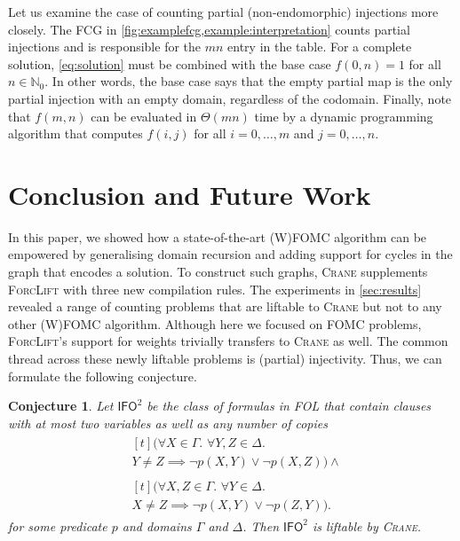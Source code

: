 \documentclass[letterpaper]{article} %
\newcommand{\IFO}{$\mathsf{I}\mathsf{FO}^{2}$}
\newtheorem{conjecture}{Conjecture}
\theoremstyle{definition}
\begin{document}
Let us examine the case of counting partial (non-endomorphic) injections more
closely. The FCG in \cref{fig:examplefcg,example:interpretation} counts partial
injections and is responsible for the $mn$ entry in the table. For a complete
solution, \cref{eq:solution} must be combined with the base case $f(0, n) = 1$
for all $n \in \mathbb{N}_{0}$. In other words, the base case says that the
empty partial map is the only partial injection with an empty domain, regardless
of the codomain. Finally, note that $f(m, n)$ can be evaluated in $\Theta(mn)$
time by a dynamic programming algorithm that computes $f(i, j)$ for all
$i = 0, \dots, m$ and $j = 0, \dots, n$.

\section{Conclusion and Future Work}\label{sec:conclusion}


In this paper, we showed how a state-of-the-art (W)FOMC algorithm can be
empowered by generalising domain recursion and adding support for cycles in the
graph that encodes a solution. To construct such graphs, \textsc{Crane}
supplements \textsc{ForcLift} \citep{DBLP:conf/ijcai/BroeckTMDR11} with three
new compilation rules. The experiments in \cref{sec:results} revealed a range of
counting problems that are liftable to \textsc{Crane} but not to any other
(W)FOMC algorithm. Although here we focused on FOMC problems,
\textsc{ForcLift}'s support for weights trivially transfers to \textsc{Crane} as
well. The common thread across these newly liftable problems is (partial)
injectivity. Thus, we can formulate the following conjecture.

\begin{conjecture}
  Let \IFO{} be the class of formulas in FOL that contain clauses with at most
  two variables as well as any number of copies
  \begin{align*}
    &\begin{multlined}[t]
      (\forall X \in \Gamma\text{. }\forall Y, Z \in \Delta\text{. }\\
      Y \ne Z \implies \neg p(X, Y) \lor \neg p(X, Z)) \land
    \end{multlined}\\
    &\begin{multlined}[t]
      (\forall X, Z \in \Gamma\text{. }\forall Y \in \Delta\text{. }\\
      X \ne Z \implies \neg p(X, Y) \lor \neg p(Z, Y)).
    \end{multlined}
  \end{align*}
  for some predicate $p$ and domains $\Gamma$ and $\Delta$. Then \IFO{} is
  liftable by \textsc{Crane}.
\end{conjecture}
\end{document}
